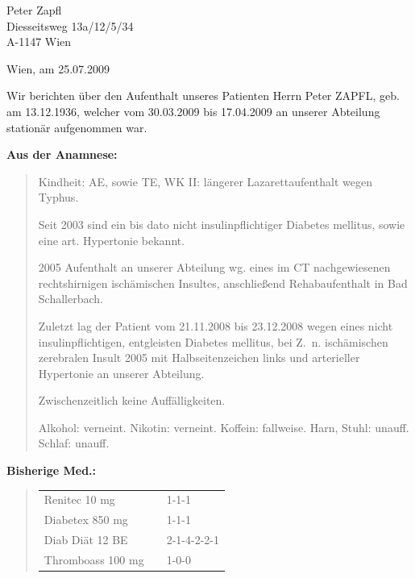 {%
\FontTtNarrowFamily

\vspace{1em}
                                                                                                                            


 Peter Zapfl\\
Diesseitsweg 13a/12/5/34 \\
A-1147 Wien
\vspace{1.5em}

\begin{flushright}
Wien, am 25.07.2009
\end{flushright}

  Wir berichten über den Aufenthalt unseres Patienten Herrn Peter ZAPFL, geb.
  am 13.12.1936, welcher vom 30.03.2009 bis 17.04.2009 an unserer Abteilung
  stationär aufgenommen war.

{\bfseries   Aus der Anamnese:}

\begin{quote}
  Kindheit: AE, sowie TE, WK II: längerer Lazarettaufenthalt
  wegen Typhus.
  
  Seit 2003 sind ein bis dato nicht insulinpflichtiger
  Diabetes mellitus, sowie eine art. Hypertonie bekannt.
  
  2005 Aufenthalt an unserer Abteilung wg. eines im
  CT nachgewiesenen rechtshirnigen
  ischämischen Insultes, anschließend Rehabaufenthalt in Bad
  Schallerbach.
  
  Zuletzt lag der Patient vom 21.11.2008 bis 23.12.2008
  wegen eines nicht insulinpflichtigen, entgleisten Diabetes
  mellitus, bei Z.~n. ischämischen zerebralen Insult 2005
  mit Halbseitenzeichen links und arterieller Hypertonie an
  unserer Abteilung.
  
  Zwischenzeitlich keine Auffälligkeiten.
  
  Alkohol: verneint. Nikotin: verneint. Koffein: fallweise.
  Harn, Stuhl: unauff.
  Schlaf: unauff.
\end{quote}


{\bfseries Bisherige Med.:} 

\begin{quote}
  \begin{tabular}{lll}
Renitec 10 mg &&1-1-1
\\
Diabetex 850 mg &&1-1-1
\\
Diab Diät 12 BE &&2-1-4-2-2-1
\\
Thromboass 100 mg &&1-0-0
\\
\end{tabular}
\end{quote}





}

